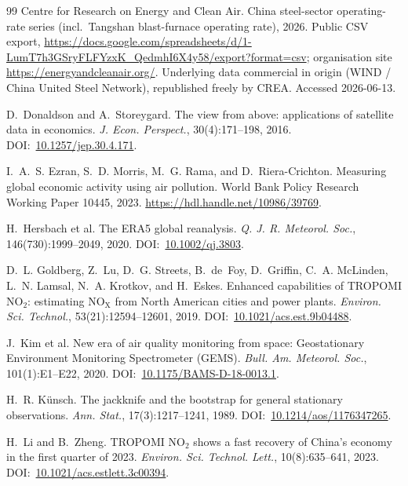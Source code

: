 \documentclass[11pt,a4paper]{article}
\providecommand{\doi}[1]{DOI:~\href{https://doi.org/#1}{#1}}
\providecommand{\ce}[1]{\ensuremath{\mathrm{#1}}}
\begin{document}
\begin{thebibliography}{99}
Centre for Research on Energy and Clean Air.
\newblock China steel-sector operating-rate series (incl.\ Tangshan blast-furnace operating rate),
2026.
\newblock Public CSV export,
\url{https://docs.google.com/spreadsheets/d/1-LumT7h3GSryFLFYzxK_QedmhI6X4y58/export?format=csv};
organisation site \url{https://energyandcleanair.org/}. Underlying data commercial in origin
(WIND / China United Steel Network), republished freely by CREA. Accessed 2026-06-13.

D.~Donaldson and A.~Storeygard.
\newblock The view from above: applications of satellite data in economics.
\newblock \emph{J. Econ. Perspect.}, 30(4):171--198, 2016.
\newblock \doi{10.1257/jep.30.4.171}.

I.~A.~S. Ezran, S.~D. Morris, M.~G. Rama, and D.~Riera-Crichton.
\newblock Measuring global economic activity using air pollution.
\newblock World Bank Policy Research Working Paper 10445, 2023.
\newblock \url{https://hdl.handle.net/10986/39769}.

H.~Hersbach et al.
\newblock The ERA5 global reanalysis.
\newblock \emph{Q. J. R. Meteorol. Soc.}, 146(730):1999--2049, 2020.
\newblock \doi{10.1002/qj.3803}.

D.~L. Goldberg, Z.~Lu, D.~G. Streets, B.~de~Foy, D.~Griffin, C.~A. McLinden, L.~N. Lamsal,
N.~A. Krotkov, and H.~Eskes.
\newblock Enhanced capabilities of TROPOMI \ce{NO_2}: estimating \ce{NO_X} from North American
cities and power plants.
\newblock \emph{Environ. Sci. Technol.}, 53(21):12594--12601, 2019.
\newblock \doi{10.1021/acs.est.9b04488}.

J.~Kim et al.
\newblock New era of air quality monitoring from space: Geostationary Environment Monitoring
Spectrometer (GEMS).
\newblock \emph{Bull. Am. Meteorol. Soc.}, 101(1):E1--E22, 2020.
\newblock \doi{10.1175/BAMS-D-18-0013.1}.

H.~R. K\"unsch.
\newblock The jackknife and the bootstrap for general stationary observations.
\newblock \emph{Ann. Stat.}, 17(3):1217--1241, 1989.
\newblock \doi{10.1214/aos/1176347265}.

H.~Li and B.~Zheng.
\newblock TROPOMI \ce{NO_2} shows a fast recovery of China's economy in the first quarter of 2023.
\newblock \emph{Environ. Sci. Technol. Lett.}, 10(8):635--641, 2023.
\newblock \doi{10.1021/acs.estlett.3c00394}.


\end{thebibliography}
\end{document}
